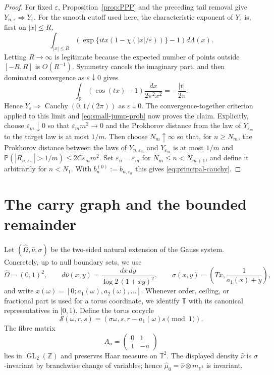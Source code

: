 \documentclass[11pt,a4paper]{amsart}
\theoremstyle{definition}
\theoremstyle{remark}
\newcommand{\T}{\mathbb T}
\newcommand{\Z}{\mathbb Z}
\newcommand{\R}{\mathbb R}
\newcommand{\Pp}{\mathbb P}
\begin{document}
\begin{proof}
For fixed $\varepsilon$, Proposition~\ref{prop:PPP} and the preceding tail
removal give $Y_{n,\varepsilon}\Longrightarrow Y_\varepsilon$.  For the
smooth cutoff used here, the characteristic exponent of $Y_\varepsilon$ is,
first on $|x|\le R$,
\[
 \int_{|x|\le R}
 \left(\exp\{itx(1-\chi(|x|/\varepsilon))\}-1\right)d\Lambda(x).
\]
Letting $R\to\infty$ is legitimate because the expected number of points
outside $[-R,R]$ is $O(R^{-1})$.  Symmetry cancels the imaginary part, and
then dominated convergence as $\varepsilon\downarrow0$ gives
\[
 \int_{\R}(\cos(tx)-1)\frac{dx}{2\pi^2x^2}
 =-\frac{|t|}{2\pi}.
\]
Hence $Y_\varepsilon\Longrightarrow
\operatorname{Cauchy}(0,1/(2\pi))$ as $\varepsilon\downarrow0$.
The convergence-together criterion applied to this limit and
\eqref{eq:small-jump-prob} now proves the claim.  Explicitly, choose
$\varepsilon_m\downarrow0$ so that $\varepsilon_m m^2\to0$ and the
Prokhorov distance from the law of $Y_{\varepsilon_m}$ to the target law is
at most $1/m$.  Then choose $N_m\uparrow\infty$ so that, for $n\ge N_m$,
the Prokhorov distance between the laws of $Y_{n,\varepsilon_m}$ and
$Y_{\varepsilon_m}$ is at most $1/m$ and
$\Pp(|R_{n,\varepsilon_m}|>1/m)\le2C\varepsilon_m m^2$.  Set
$\varepsilon_n=\varepsilon_m$ for $N_m\le n<N_{m+1}$, and define it
arbitrarily for $n<N_1$.  With
$b_n^{(0)}:=b_{n,\varepsilon_n}$ this gives
\eqref{eq:principal-cauchy}.
\end{proof}





\section{The carry graph and the bounded remainder}

Let $(\widehat\Omega,\widehat\nu,\sigma)$ be the two-sided natural extension
of the Gauss system.  Concretely, up to null boundary sets, we use
\[
 \widehat\Omega=(0,1)^2,
 \qquad
 d\widehat\nu(x,y)=\frac{dx\,dy}{\log2\,(1+xy)^2},
 \qquad
 \sigma(x,y)=\left(Tx,\frac1{a_1(x)+y}\right),
\]
and write $x(\omega)=[0;a_1(\omega),a_2(\omega),\ldots]$.
Whenever order, ceiling, or fractional part is used for a torus coordinate,
we identify $\T$ with its canonical representatives in $[0,1)$.
Define the torus cocycle
\begin{equation}\label{eq:S-cocycle}
 \mathcal S(\omega,r,s)=
 (\sigma\omega,s,r-a_1(\omega)s\pmod1).
\end{equation}
The fibre matrix
\[
 A_a=\begin{pmatrix}0&1\\1&-a\end{pmatrix}
\]
lies in $\operatorname{GL}_2(\Z)$ and preserves Haar measure on $\T^2$.
The displayed density $\widehat\nu$ is $\sigma$-invariant by branchwise
change of variables; hence
$\widehat\mu_0=\widehat\nu\otimes m_{\T^2}$ is invariant.
\end{document}
